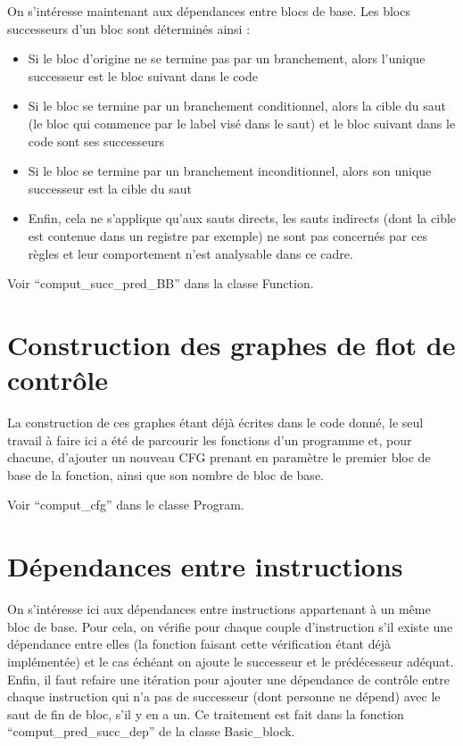 \documentclass[a4paper, 11pt]{report}
\begin{document}
On s'intéresse maintenant aux dépendances entre blocs de base. Les blocs successeurs d'un bloc sont déterminés ainsi :
\begin{itemize}
\item Si le bloc d'origine ne se termine pas par un branchement, alors l'unique successeur est le bloc suivant dans le code
\item Si le bloc se termine par un branchement conditionnel, alors la cible du saut (le bloc qui commence par le label visé dans le saut) et le bloc suivant dans le code sont ses successeurs
\item Si le bloc se termine par un branchement inconditionnel, alors son unique successeur est la cible du saut
\item Enfin, cela ne s'applique qu'aux sauts directs, les sauts indirects (dont la cible est contenue dans un registre par exemple) ne sont pas concernés par ces règles et leur comportement n'est analysable dans ce cadre.
\end{itemize}

Voir ``comput\_succ\_pred\_BB'' dans la classe Function.

\section{Construction des graphes de flot de contrôle}

La construction de ces graphes étant déjà écrites dans le code donné, le seul travail à faire ici a été de parcourir les fonctions d'un programme et, pour chacune, d'ajouter un nouveau CFG prenant en paramètre le premier bloc de base de la fonction, ainsi que son nombre de bloc de base.

Voir ``comput\_cfg'' dans le classe Program.

\section{Dépendances entre instructions}

On s'intéresse ici aux dépendances entre instructions appartenant à un même bloc de base. Pour cela, on vérifie pour chaque couple d'instruction s'il existe une dépendance entre elles (la fonction faisant cette vérification étant déjà implémentée) et le cas échéant on ajoute le successeur et le prédécesseur adéquat. Enfin, il faut refaire une itération pour ajouter une dépendance de contrôle entre chaque instruction qui n'a pas de successeur (dont personne ne dépend) avec le saut de fin de bloc, s'il y en a un. Ce traitement est fait dans la fonction ``comput\_pred\_succ\_dep'' de la classe Basic\_block. 
\end{document}
